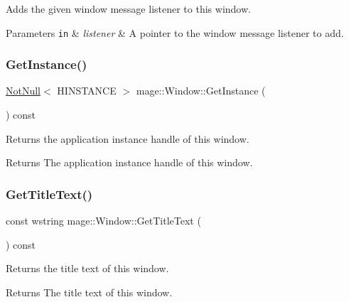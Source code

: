 Adds the given window message listener to this window.


\begin{DoxyParams}[1]{Parameters}
\mbox{\tt in}  & {\em listener} & A pointer to the window message listener to add. \\
\hline
\end{DoxyParams}
\hypertarget{classmage_1_1_window_a809eff149af9fd2e66eec176078d0127}{}\label{classmage_1_1_window_a809eff149af9fd2e66eec176078d0127} 
\subsubsection{\texorpdfstring{Get\+Instance()}{GetInstance()}}
{\footnotesize\ttfamily \hyperlink{namespacemage_a8769f9d670d6b585ea306cb1062af94b}{Not\+Null}$<$ H\+I\+N\+S\+T\+A\+N\+CE $>$ mage\+::\+Window\+::\+Get\+Instance (\begin{DoxyParamCaption}{ }\end{DoxyParamCaption}) const\hspace{0.3cm}{\ttfamily [noexcept]}}

Returns the application instance handle of this window.

\begin{DoxyReturn}{Returns}
The application instance handle of this window. 
\end{DoxyReturn}
\hypertarget{classmage_1_1_window_a62bf5cd2d9dbdf53947cec3cccee04db}{}\label{classmage_1_1_window_a62bf5cd2d9dbdf53947cec3cccee04db} 
\subsubsection{\texorpdfstring{Get\+Title\+Text()}{GetTitleText()}}
{\footnotesize\ttfamily const wstring mage\+::\+Window\+::\+Get\+Title\+Text (\begin{DoxyParamCaption}{ }\end{DoxyParamCaption}) const\hspace{0.3cm}{\ttfamily [noexcept]}}

Returns the title text of this window.

\begin{DoxyReturn}{Returns}
The title text of this window. 
\end{DoxyReturn}
\hypertarget{classmage_1_1_window_a0f791c3fb8f5be34a17ae2a93767a613}{}\label{classmage_1_1_window_a0f791c3fb8f5be34a17ae2a93767a613} 
